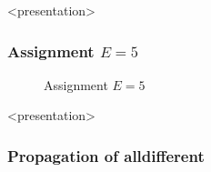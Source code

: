\begin{frame}<presentation>
\frametitle{Assignment $E=5$}
\begin{center}

\end{center}
\end{frame}

\begin{figure}[ht]
\caption{\label{sendmore:assignmente5}Assignment $E=5$}
\begin{center}

\end{center}
\end{figure}



\begin{frame}<presentation>
\frametitle{Propagation of alldifferent}
\begin{center}
\end{center}
\end{frame}


